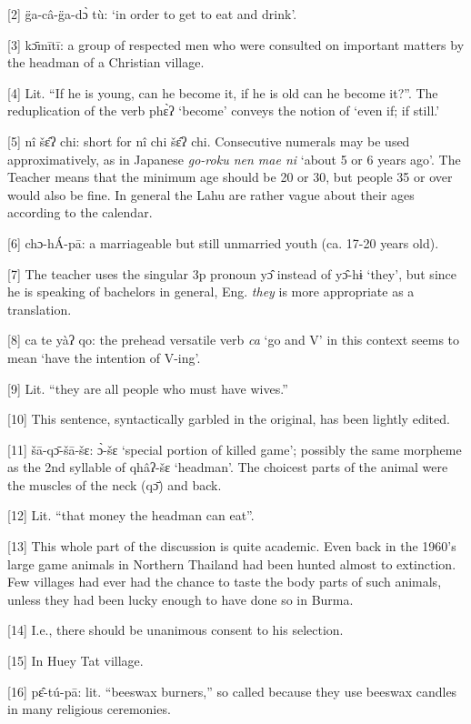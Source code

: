 {[2] g̈a-câ-g̈a-dɔ̀ tù: `in order to get to eat and drink'.}

{[3] kɔ̄mītī: a group of respected men who were consulted on important
matters by the headman of a Christian village.}

{[4] Lit. ``If he is young, can he become it, if he is old can he become
it?''. The reduplication of the verb phɛ̀ʔ `become' conveys the notion of `even
if; if still.'}

{[5] nî šɛ̂ʔ chi: short for nî chi šɛ̂ʔ chi. Consecutive numerals
may be used approximatively, as in Japanese }{\textit{go-roku nen mae ni}}{
`about 5 or 6 years ago'. The Teacher means that the minimum age should be 20 or
30, but people 35 or over would also be fine. In general the Lahu are rather vague
about their ages according to the calendar.}

{[6] chɔ-hÁ-pā: a marriageable but still unmarried youth (ca. 17-20
years old). }

{[7] The teacher uses the singular 3p pronoun yɔ̂ instead of yɔ̂-hɨ
`they', but since he is speaking of bachelors in general, Eng. }{\textit{they}}{
is more appropriate as a translation.}

{[8] ca te yàʔ qo: the prehead versatile verb }{\textit{ca}}{
`go and V' in this context seems to mean `have the intention of V-ing'.}

{[9] Lit. ``they are all people who must have wives.''}

{[10] This sentence, syntactically garbled in the original, has been lightly
edited.}

{[11] šā-qɔ̄-šā-šɛ: ɔ̀-šɛ `special portion of killed game';
possibly the same morpheme as the 2nd syllable of qhâʔ-šɛ `headman'. The choicest
parts of the animal were the muscles of the neck (qɔ̄) and back.}

{[12] Lit. ``that money the headman can eat''.}

{[13] This whole part of the discussion is quite academic. Even back in
the 1960's large game animals in Northern Thailand had been hunted almost to extinction.
Few villages had ever had the chance to taste the body parts of such animals, unless
they had been lucky enough to have done so in Burma.}

{[14] I.e., there should be unanimous consent to his selection.}

{[15] In Huey Tat village.}

{[16] pɛ̂-tú-pā: lit. ``beeswax burners,'' so called because they use
beeswax candles in many religious ceremonies.}

